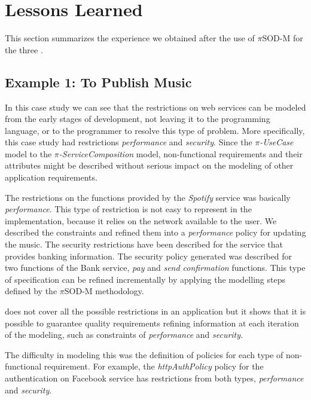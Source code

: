 \section{Lessons Learned}
\label{sec:leassonsLearned}

This section summarizes the experience we obtained after the use of $\pi$SOD-M
for the three . 

\subsection{Example 1: To Publish Music} 
 
In this case study we can see that the restrictions on web services can be
modeled from the early stages of development, not leaving it to the programming
language, or to the programmer to resolve this type of problem. More
specifically, this case study had restrictions \textit{performance} and \textit{security}. Since
the \textit{$\pi$-UseCase} model to the \textit{$\pi$-ServiceComposition} model,
non-functional requirements and their attributes might be described without
serious impact on the modeling of other application requirements.  

The restrictions on the functions provided by
the \textit{Spotify} service was basically \textit{performance}. This type of
restriction is not easy to represent in the implementation, because it relies on
the network available to the user. We described the
constraints and refined them into a \textit{ performance} policy for updating
the music. The security restrictions have been described for the service that provides banking information. The security policy generated was described
for two functions of the Bank service, \textit{pay} and \textit{send
confirmation} functions. This type of specification can be refined incrementally
by applying the modelling steps defined by the $\pi$SOD-M methodology.

 does not cover all the possible restrictions in
an application but it shows that it is possible to guarantee
quality requirements refining information at each iteration of the modeling,
such as constraints of \textit{performance} and \textit{security}.

The difficulty in modeling this  was the definition of policies for
each type of non-functional requirement. For example, the \textit{httpAuthPolicy} policy for
the authentication on Facebook service has restrictions from
both types, \textit{performance} and \textit{security}. 

